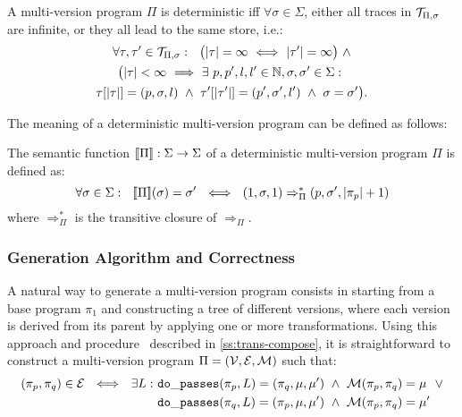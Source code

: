 \begin{definition}
\label{de:deterministic-mvp}
A multi-version program $\Pi$ is deterministic iff $\forall \sigma\in\Sigma$, either all traces in ${\cal T}_{\Pi,\sigma}$ are infinite, or they all lead to the same store, i.e.:
\begin{gather*}
\forall \tau, \tau'\in{\cal T}_{\Pi,\sigma}: ~~ \big(|\tau|=\infty ~ \Longleftrightarrow ~ |\tau'|=\infty\big) ~ \wedge \\
\big(|\tau|<\infty ~ \Longrightarrow ~ \exists~p,p',l,l'\in\mathbb{N}, \sigma,\sigma'\in\Sigma: ~ \\
\tau[|\tau|]=(p,\sigma,l) ~ \wedge ~ \tau'[|\tau'|]=(p',\sigma',l') ~ \wedge ~ \sigma=\sigma' \big).
\end{gather*}
\end{definition}

\noindent The meaning of a deterministic multi-version program can be defined as follows:

\begin{definition}
\label{de:mv-program-semantics}
The semantic function $[\![\Pi]\!]:\Sigma \rightarrow \Sigma$ of a deterministic multi-version program $\Pi$ is defined as: 
$$
\forall \sigma\in\Sigma: ~~ [\![\Pi]\!](\sigma)=\sigma' ~~ \Longleftrightarrow ~~ (1,\sigma,1) \Rightarrow^{*}_{\Pi} (p,\sigma',|\pi_p|+1)
$$
where $\Rightarrow^{*}_{\Pi}$ is the transitive closure of $\Rightarrow_{\Pi}$.
\end{definition}

\subsubsection*{Generation Algorithm and Correctness}

A natural way to generate a multi-version program consists in starting from a base program $\pi_1$ and constructing a tree of different versions, where each version is derived from its parent by applying one or more transformations. Using this approach and procedure \dopasses\ described in \mysection\ref{ss:trans-compose}, it is straightforward to construct a multi-version program $\Pi=({\cal V}, {\cal E}, {\cal M})$ such that:
\vspace{-1mm}
\begin{align*}
(\pi_p,\pi_q)\in {\cal E} ~~ \Longleftrightarrow ~~ \exists L: ~ &{\tt do\_passes}(\pi_p,L)=(\pi_q,\mu,\mu') ~ \wedge ~ {\cal M}(\pi_p,\pi_q)=\mu ~~ \vee \\
&{\tt do\_passes}(\pi_q,L)=(\pi_p,\mu,\mu') ~ \wedge ~ {\cal M}(\pi_p,\pi_q)=\mu'
\end{align*}

